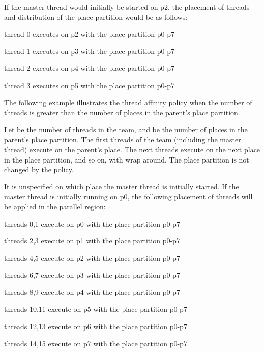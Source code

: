 If the master thread would initially be started on p2, the placement of threads 
and distribution of the place partition would be as follows:

\begin{compactitem}
\item thread 0 executes on p2 with the place partition p0-p7

\item thread 1 executes on p3 with the place partition p0-p7

\item thread 2 executes on p4 with the place partition p0-p7

\item thread 3 executes on p5 with the place partition p0-p7
\end{compactitem}

The following example illustrates the  thread affinity policy when 
the number of threads is greater than the number of places in the parent's place 
partition.

Let  be the number of threads in the team, and  be the number of places in the 
parent's place partition. The first  threads of the team (including the master 
thread) execute on the parent's place. The next  threads execute on the next 
place in the place partition, and so on, with wrap around. The place partition 
is not changed by the  policy.



It is unspecified on which place the master thread is initially started. If the 
master thread is initially running on p0, the following placement of threads will 
be applied in the parallel region:

\begin{compactitem}
\item threads 0,1 execute on p0 with the place partition p0-p7

\item threads 2,3 execute on p1 with the place partition p0-p7

\item threads 4,5 execute on p2 with the place partition p0-p7

\item threads 6,7 execute on p3 with the place partition p0-p7

\item threads 8,9 execute on p4 with the place partition p0-p7

\item threads 10,11 execute on p5 with the place partition p0-p7

\item threads 12,13 execute on p6 with the place partition p0-p7

\item threads 14,15 execute on p7 with the place partition p0-p7
\end{compactitem}

